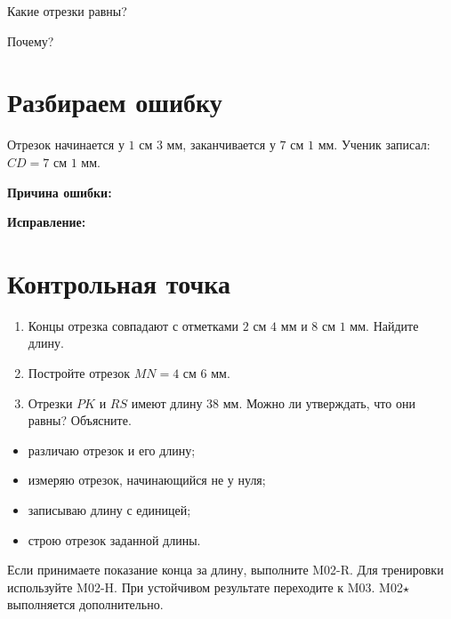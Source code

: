 \equalcontrastingsegmentsfigure

\begin{practicebox}
  Какие отрезки равны? \answerblank[48mm]

  Почему? \answerblank[90mm]
\end{practicebox}

\section{Разбираем ошибку}

\begin{warningbox}
  Отрезок начинается у $1\text{ см }3\text{ мм}$, заканчивается у
  $7\text{ см }1\text{ мм}$. Ученик записал: $CD=7\text{ см }1\text{ мм}$.

  \textbf{Причина ошибки:} \answerblank[100mm]

  \textbf{Исправление:} \answerblank[100mm]
\end{warningbox}

\section{Контрольная точка}

\begin{checkpointbox}
  \begin{enumerate}[label=\textbf{\arabic*.}]
    \item Концы отрезка совпадают с отметками $2\text{ см }4\text{ мм}$ и
      $8\text{ см }1\text{ мм}$. Найдите длину. 
    \item Постройте отрезок $MN=4\text{ см }6\text{ мм}$.
      \workarea{25mm}
    \item Отрезки $PK$ и $RS$ имеют длину $38\text{ мм}$. Можно ли
      утверждать, что они равны? Объясните. 
  \end{enumerate}
\end{checkpointbox}

\begin{reflectionbox}
  \begin{itemize}[label=\choicebox]
    \item различаю отрезок и его длину;
    \item измеряю отрезок, начинающийся не у нуля;
    \item записываю длину с единицей;
    \item строю отрезок заданной длины.
  \end{itemize}
\end{reflectionbox}

\begin{resultbox}
  Если принимаете показание конца за длину, выполните M02-R. Для тренировки
  используйте M02-H. При устойчивом результате переходите к M03.
  M02\(\star\) выполняется дополнительно.
\end{resultbox}
